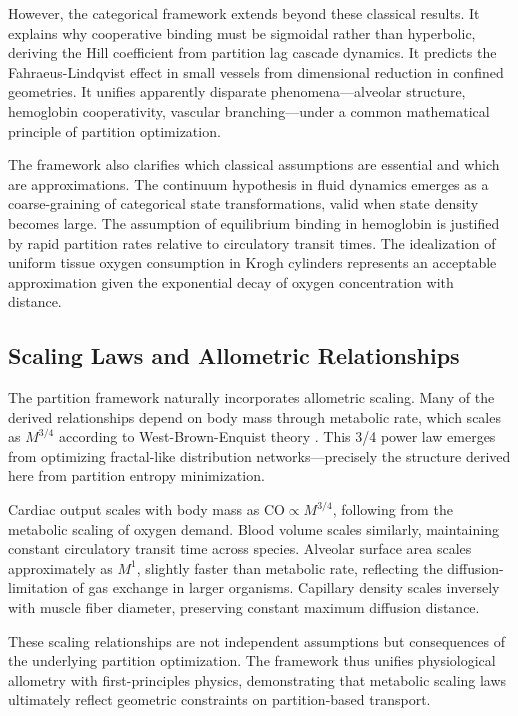 \documentclass[12pt,a4paper]{article}
\theoremstyle{remark}
\begin{document}
However, the categorical framework extends beyond these classical results. It explains why cooperative binding must be sigmoidal rather than hyperbolic, deriving the Hill coefficient from partition lag cascade dynamics. It predicts the Fahraeus-Lindqvist effect in small vessels from dimensional reduction in confined geometries. It unifies apparently disparate phenomena—alveolar structure, hemoglobin cooperativity, vascular branching—under a common mathematical principle of partition optimization.

The framework also clarifies which classical assumptions are essential and which are approximations. The continuum hypothesis in fluid dynamics emerges as a coarse-graining of categorical state transformations, valid when state density becomes large. The assumption of equilibrium binding in hemoglobin is justified by rapid partition rates relative to circulatory transit times. The idealization of uniform tissue oxygen consumption in Krogh cylinders represents an acceptable approximation given the exponential decay of oxygen concentration with distance.

\subsection{Scaling Laws and Allometric Relationships}

The partition framework naturally incorporates allometric scaling. Many of the derived relationships depend on body mass through metabolic rate, which scales as $M^{3/4}$ according to West-Brown-Enquist theory \cite{west1997general}. This 3/4 power law emerges from optimizing fractal-like distribution networks—precisely the structure derived here from partition entropy minimization.

Cardiac output scales with body mass as $\mathrm{CO} \propto M^{3/4}$, following from the metabolic scaling of oxygen demand. Blood volume scales similarly, maintaining constant circulatory transit time across species. Alveolar surface area scales approximately as $M^{1}$, slightly faster than metabolic rate, reflecting the diffusion-limitation of gas exchange in larger organisms. Capillary density scales inversely with muscle fiber diameter, preserving constant maximum diffusion distance.

These scaling relationships are not independent assumptions but consequences of the underlying partition optimization. The framework thus unifies physiological allometry with first-principles physics, demonstrating that metabolic scaling laws ultimately reflect geometric constraints on partition-based transport.
\end{document}

